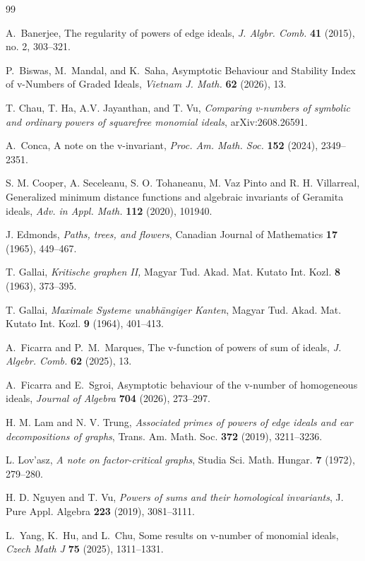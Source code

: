 \documentclass[12pt,reqno,twoside]{amsart}
\theoremstyle{definition}
\theoremstyle{plain}
\theoremstyle{remark}
\numberwithin{equation}{section}
\begin{document}
\begin{thebibliography}{99}



A.~Banerjee, The regularity of powers of edge ideals, {\em J. Algbr. Comb. } {\bf 41} (2015), no. 2, 303--321.
	

P.~Biswas, M.~Mandal, and K.~Saha,
Asymptotic Behaviour and Stability Index of v-Numbers of Graded Ideals, {\em Vietnam J. Math.} {\bf 62} (2026), 13. 


 T. Chau, T. Ha, A.V. Jayanthan, and T. Vu, {\it Comparing v-numbers of symbolic and ordinary powers of squarefree monomial ideals}, arXiv:2608.26591.

A.~Conca,
A note on the v-invariant, {\em Proc. Am. Math. Soc.} {\bf 152} (2024), 2349--2351.



S. M. Cooper, A. Seceleanu, S. O. Tohaneanu, M. Vaz Pinto and R. H. Villarreal, Generalized minimum distance functions and algebraic invariants of Geramita ideals,
{\em Adv. in Appl. Math.} {\bf 112} (2020), 101940.



J. Edmonds,
\emph{Paths, trees, and flowers}, Canadian Journal of Mathematics {\bf 17} (1965), 449--467.



T. Gallai,
{\em Kritische graphen II,} Magyar Tud. Akad. Mat. Kutato Int. Kozl. {\bf 8} (1963), 373--395.


 
T. Gallai,
{\em Maximale Systeme unabh\"angiger Kanten}, Magyar Tud. Akad. Mat. Kutato Int. Kozl. {\bf 9} (1964), 401--413.


A.~Ficarra and P.~M.~Marques,
The v-function of powers of sum of ideals, {\em J. Algebr. Comb.} {\bf 62} (2025), 13. 



A.~Ficarra and E.~Sgroi,
Asymptotic behaviour of the v-number of homogeneous ideals, {\em Journal of Algebra} {\bf 704} (2026), 273--297.


H. M. Lam and N. V. Trung,
{\em Associated primes of powers of edge ideals and ear decompositions of graphs}, Trans. Am. Math. Soc. {\bf 372} (2019), 3211--3236.


 

L. Lov'asz,
{\em A note on factor-critical graphs}, Studia Sci. Math. Hungar. {\bf 7} (1972), 279--280.

H. D. Nguyen and T. Vu,
{\em Powers of sums and their homological invariants}, J. Pure Appl. Algebra {\bf 223} (2019), 3081--3111.


L.~Yang, K.~Hu, and L.~Chu,
Some results on v-number of monomial ideals, {\em Czech Math J} {\bf 75} (2025), 1311--1331.


 


\end{thebibliography}
\end{document}
